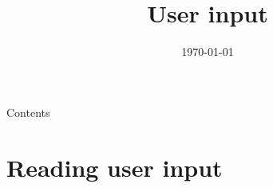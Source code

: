 
\newcommand{\topic}{
	User input
}

\title{\topic}
\supertitle{\course}
\date{\today}



\maketitle

\begin{frame}{Contents}
	\tableofcontents
\end{frame}

\section{Reading user input}
